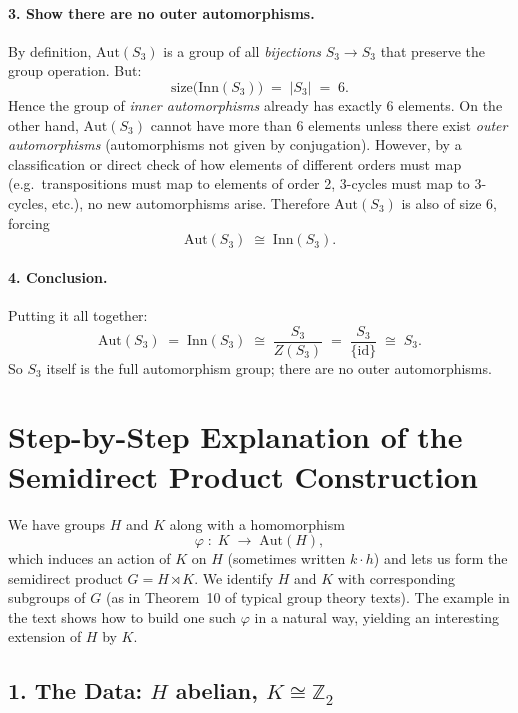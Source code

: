 \documentclass[12pt]{article}
\theoremstyle{definition} %
\theoremstyle{plain} %
\begin{document}
\paragraph{3. Show there are no outer automorphisms.}
By definition, $\mathrm{Aut}(S_3)$ is a group of all \emph{bijections} $S_3 \to S_3$ that preserve the group operation. But:
\[
  \text{size}\bigl(\mathrm{Inn}(S_3)\bigr) \;=\; |S_3| \;=\; 6.
\]
Hence the group of \emph{inner automorphisms} already has exactly 6 elements. 
On the other hand, $\mathrm{Aut}(S_3)$ cannot have more than 6 elements unless there exist
\emph{outer automorphisms} (automorphisms not given by conjugation). 
However, by a classification or direct check of how elements of different orders must map 
(e.g.\ transpositions must map to elements of order 2, 3-cycles must map to 3-cycles, etc.), 
no new automorphisms arise. 
Therefore $\mathrm{Aut}(S_3)$ is also of size 6, forcing
\[
  \mathrm{Aut}(S_3) \;\cong\; \mathrm{Inn}(S_3).
\]

\paragraph{4. Conclusion.}
Putting it all together:
\[
  \mathrm{Aut}(S_3) \;=\; \mathrm{Inn}(S_3) 
  \;\cong\; \dfrac{S_3}{Z(S_3)}
  \;=\; \dfrac{S_3}{\{\mathrm{id}\}}
  \;\cong\; S_3.
\]
So $S_3$ itself is the full automorphism group; there are no outer automorphisms. 

\section*{Step-by-Step Explanation of the Semidirect Product Construction}

We have groups $H$ and $K$ along with a homomorphism 
\[
  \varphi \;:\; K \;\longrightarrow\; \mathrm{Aut}(H),
\]
which induces an action of $K$ on $H$ (sometimes written $k \cdot h$) and 
lets us form the semidirect product $G = H \rtimes K$. 
We identify $H$ and $K$ with corresponding subgroups of $G$ (as in Theorem~10 of typical group theory texts). 
The example in the text shows how to build one such $\varphi$ in a natural way, 
yielding an interesting extension of $H$ by $K$.

\subsection*{1. The Data: \texorpdfstring{$H$}{H} abelian, \texorpdfstring{$K \cong \mathbb{Z}_2$}{K = Z2}}
\end{document}
